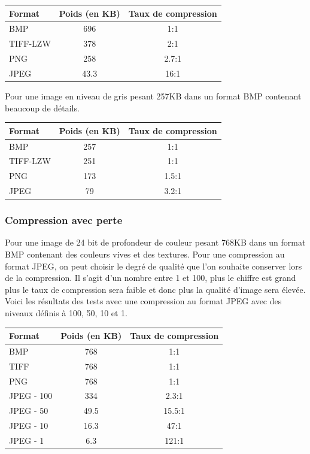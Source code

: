 \documentclass[a4paper, 12pt]{article} %
\begin{document}
\begin{center}
\centering
	\begin{tabular}{|l|c|c|}
		\hline
		Format & Poids (en KB)& Taux de compression\\
		\hline
		BMP&696&1:1\\
		TIFF-LZW&378&2:1\\
		PNG&258&2.7:1\\
		JPEG&43.3&16:1\\
		\hline
	\end{tabular}
\end {center}

Pour une image en niveau de gris pesant 257KB dans un format BMP contenant beaucoup de détails.
\begin{center}
\centering
	\begin{tabular}{|l|c|c|}
		\hline
		Format & Poids (en KB)& Taux de compression\\
		\hline
		BMP&257&1:1\\
		TIFF-LZW&251&1:1\\
		PNG&173&1.5:1\\
		JPEG&79&3.2:1\\
		\hline
	\end{tabular}
\end{center}

\subsubsection{Compression avec perte}

Pour une image de 24 bit de profondeur de couleur pesant 768KB dans un format BMP contenant des couleurs vives et des textures. Pour une compression au format JPEG, on peut choisir le degré de qualité que l'on souhaite conserver lors de la compression. Il s'agit d'un nombre entre 1 et 100, plus le chiffre est grand plus le taux de compression sera faible et donc plus la qualité d'image sera élevée. Voici les résultats des tests avec une compression au format JPEG avec des niveaux définis à 100, 50, 10 et 1.

\begin{center}
	\begin{tabular}{|l|c|c|}
		\hline
		Format & Poids (en KB)& Taux de compression\\
		\hline
		BMP&768&1:1\\
		TIFF&768&1:1\\
		PNG&768&1:1\\
		JPEG - 100&334&2.3:1\\
		JPEG - 50&49.5&15.5:1\\
		JPEG - 10&16.3&47:1\\
		JPEG - 1&6.3&121:1\\
		\hline
	\end{tabular}
\end{center}
\end{document}
